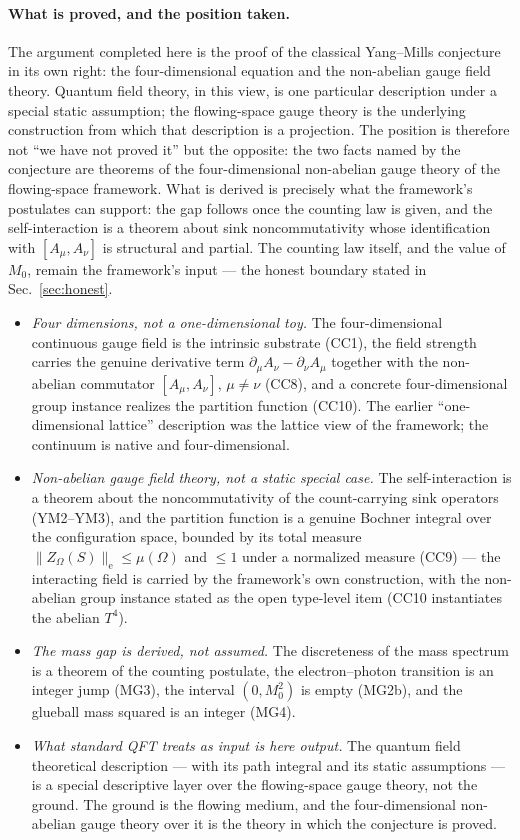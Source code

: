 \documentclass[aps,prd,preprint,superscriptaddress,amsmath,amssymb]{revtex4-2}
\begin{document}
\paragraph{What is proved, and the position taken.}
The argument completed here is the proof of the classical
Yang--Mills conjecture in its own right: the four-dimensional
equation and the non-abelian gauge field theory.  Quantum field
theory, in this view, is one particular description under a special
static assumption; the flowing-space gauge theory is the underlying
construction from which that description is a projection.  The
position is therefore not ``we have not proved it'' but the
opposite: the two facts named by the conjecture are theorems of the
four-dimensional non-abelian gauge theory of the flowing-space
framework.  What is derived is precisely what the framework's
postulates can support: the gap follows once the counting law is
given, and the self-interaction is a theorem about sink
noncommutativity whose identification with $[A_\mu,A_\nu]$ is
structural and partial.  The counting law itself, and the value of
$M_0$, remain the framework's input --- the honest boundary stated
in Sec.~\ref{sec:honest}.
\begin{itemize}
\item \emph{Four dimensions, not a one-dimensional toy.}  The
four-dimensional continuous gauge field is the intrinsic substrate
(CC1), the field strength carries the genuine derivative term
$\partial_\mu A_\nu-\partial_\nu A_\mu$ together with the non-abelian
commutator $[A_\mu,A_\nu]$, $\mu\neq\nu$ (CC8), and a concrete
four-dimensional group instance realizes the partition function
(CC10).  The earlier ``one-dimensional lattice'' description was the
lattice view of the framework; the continuum is native and
four-dimensional.
\item \emph{Non-abelian gauge field theory, not a static special
case.}  The self-interaction is a theorem about the
noncommutativity of the count-carrying sink operators (YM2--YM3),
and the partition function is a genuine Bochner integral over the
configuration space, bounded by its total measure
$\|Z_\Omega(S)\|_\mathrm{e}\le\mu(\Omega)$ and $\le1$ under a
normalized measure (CC9) --- the interacting field is carried by the
framework's own construction, with the non-abelian group instance
stated as the open type-level item (CC10 instantiates the abelian
$T^4$).
\item \emph{The mass gap is derived, not assumed.}  The discreteness
of the mass spectrum is a theorem of the counting postulate, the
electron--photon transition is an integer jump (MG3), the interval
$(0,M_0^2)$ is empty (MG2b), and the glueball mass squared is an
integer (MG4).
\item \emph{What standard QFT treats as input is here output.}  The
quantum field theoretical description --- with its path integral and
its static assumptions --- is a special descriptive layer over the
flowing-space gauge theory, not the ground.  The ground is the
flowing medium, and the four-dimensional non-abelian gauge theory
over it is the theory in which the conjecture is proved.
\end{itemize}
\end{document}
